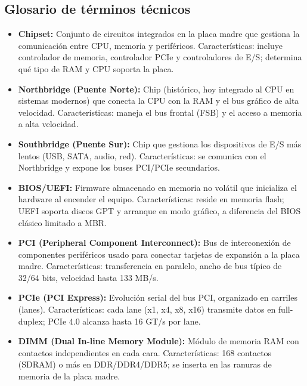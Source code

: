 \documentclass[10pt]{article}
\begin{document}
\begin{longtable}{|p{3.5cm}|p{4.0cm}|p{6.5cm}|}
\end{longtable}
\endgroup

\subsection{Glosario de términos técnicos}

\begin{itemize}
    \item \textbf{Chipset:} Conjunto de circuitos integrados en la placa madre que gestiona la comunicación entre CPU, memoria y periféricos. Características: incluye controlador de memoria, controlador PCIe y controladores de E/S; determina qué tipo de RAM y CPU soporta la placa.

    \item \textbf{Northbridge (Puente Norte):} Chip (histórico, hoy integrado al CPU en sistemas modernos) que conecta la CPU con la RAM y el bus gráfico de alta velocidad. Características: maneja el bus frontal (FSB) y el acceso a memoria a alta velocidad.

    \item \textbf{Southbridge (Puente Sur):} Chip que gestiona los dispositivos de E/S más lentos (USB, SATA, audio, red). Características: se comunica con el Northbridge y expone los buses PCI/PCIe secundarios.

    \item \textbf{BIOS/UEFI:} Firmware almacenado en memoria no volátil que inicializa el hardware al encender el equipo. Características: reside en memoria flash; UEFI soporta discos GPT y arranque en modo gráfico, a diferencia del BIOS clásico limitado a MBR.

    \item \textbf{PCI (Peripheral Component Interconnect):} Bus de interconexión de componentes periféricos usado para conectar tarjetas de expansión a la placa madre. Características: transferencia en paralelo, ancho de bus típico de 32/64 bits, velocidad hasta 133 MB/s.

    \item \textbf{PCIe (PCI Express):} Evolución serial del bus PCI, organizado en carriles (lanes). Características: cada lane (x1, x4, x8, x16) transmite datos en full-duplex; PCIe 4.0 alcanza hasta 16 GT/s por lane.

    \item \textbf{DIMM (Dual In-line Memory Module):} Módulo de memoria RAM con contactos independientes en cada cara. Características: 168 contactos (SDRAM) o más en DDR/DDR4/DDR5; se inserta en las ranuras de memoria de la placa madre.


\end{itemize}
\end{document}
